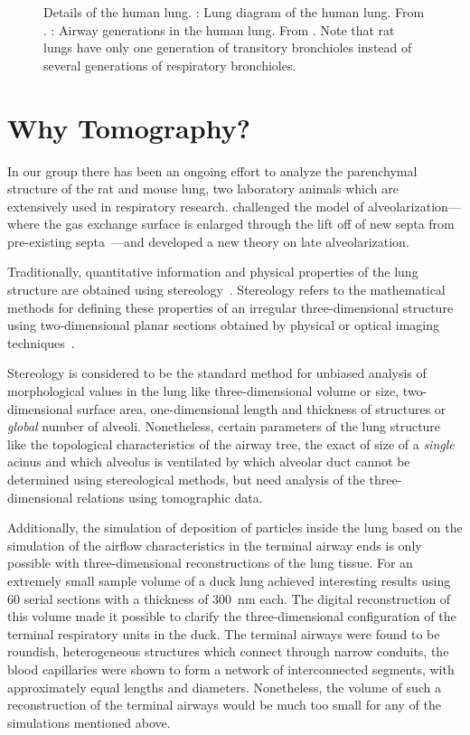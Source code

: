 \begin{figure}
{		\label{subfig:lung units}%
		}%
	\caption[Details of the human lung]{Details of the human lung. : Lung diagram of the human lung. From \cite{LungDiagram}. : Airway generations in the human lung. From \cite{Schittny2007a}. Note that rat lungs have only one generation of transitory bronchioles instead of several generations of respiratory bronchioles.}%
	\label{fig:lung}%
\end{figure}

\section{Why Tomography?}
In our group there has been an ongoing effort to analyze the parenchymal structure of the rat and mouse lung, two laboratory animals which are extensively used in respiratory research. \citet{Mund2008} challenged the model of alveolarization---where the gas exchange surface is enlarged through the lift off of new septa from pre-existing septa~\cite{Burri1974,Massaro1985}---and developed a new theory on late alveolarization.

Traditionally, quantitative information and physical properties of the lung structure are obtained using stereology~\cite{Ochs2006}. Stereology refers to the mathematical methods for defining these properties of an irregular three-dimensional structure using two-dimensional planar sections obtained by physical or optical imaging techniques~\cite{Hsia2010}.

Stereology is considered to be the standard method for unbiased analysis of morphological values in the lung like three-dimensional volume or size, two-dimensional surface area, one-dimensional length and thickness of structures or \emph{global} number of alveoli. Nonetheless, certain parameters of the lung structure like the topological characteristics of the airway tree, the exact of size of a \emph{single} acinus and which alveolus is ventilated by which alveolar duct cannot be determined using stereological methods, but need analysis of the three-dimensional relations using tomographic data.

Additionally, the simulation of deposition of particles inside the lung based on the simulation of the airflow characteristics in the terminal airway ends is only possible with three-dimensional reconstructions of the lung tissue. For an extremely small sample volume of a duck lung \citet{Woodward2005} achieved interesting results using 60 serial sections with a thickness of \SI{300}{\nano\meter} each. The digital reconstruction of this volume made it possible to clarify the three-dimensional configuration of the terminal respiratory units in the duck. The terminal airways were found to be roundish, heterogeneous structures which connect through narrow conduits, the blood capillaries were shown to form a network of interconnected segments, with approximately equal lengths and diameters. Nonetheless, the volume of such a reconstruction of the terminal airways would be much too small for any of the simulations mentioned above.

